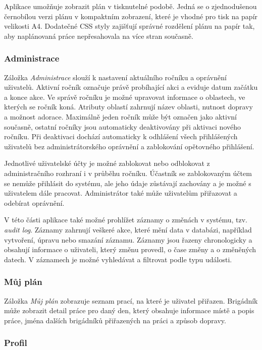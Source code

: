 Aplikace umožňuje zobrazit plán v tisknutelné podobě. Jedná se o zjednodušenou černobílou verzi plánu v kompaktním zobrazení, které je vhodné pro tisk na 
papír velikosti A4. Dodatečné CSS styly zajišťují správné rozdělení plánu na papír tak, aby naplánovaná práce nepřesahovala na více stran současně.

\subsubsection{Administrace}

Záložka \textit{Administrace} slouží k nastavení aktuálního ročníku a oprávnění uživatelů. Aktivní ročník
označuje právě probíhající akci a eviduje datum začátku a konce akce. Ve správě ročníku je možné upravovat informace o oblastech, ve kterých
se ročník koná. Atributy oblastí zahrnují název oblasti, nutnost dopravy a možnost adorace. Maximálně jeden ročník může být označen jako
aktivní současně, ostatní ročníky jsou automaticky deaktivovány při aktivaci nového ročníku. Při deaktivaci dochází automaticky 
k odhlášení všech přihlášených uživatelů bez administrátorského oprávnění a zablokování opětovného přihlášení.

Jednotlivé uživatelské účty je možné zablokovat nebo odblokovat z administračního rozhraní i v průběhu ročníku. Účastník se zablokovaným účtem
se nemůže přihlásit do systému, ale jeho údaje zůstávají zachovány a je možné s uživatelem dále pracovat. Administrátor také může uživatelům
přiřazovat a odebírat oprávnění.

V této části aplikace také možné prohlížet záznamy o změnách v systému, tzv. \textit{audit log}. Záznamy zahrnují veškeré akce, které mění data v databázi,
například vytvoření, úpravu nebo smazání záznamu. Záznamy jsou řazeny chronologicky a obsahují informace o uživateli, který změnu provedl,
o čase změny a o změněných datech. V záznamech je možné vyhledávat a filtrovat podle typu události.

\subsubsection{Můj plán}

Záložka \textit{Můj plán} zobrazuje seznam prací, na které je uživatel přiřazen. Brigádník může zobrazit detail práce pro daný den,
který obsahuje informace místě a popis práce, jména dalších brigádníků přiřazených na práci a způsob dopravy.

\subsubsection{Profil}

